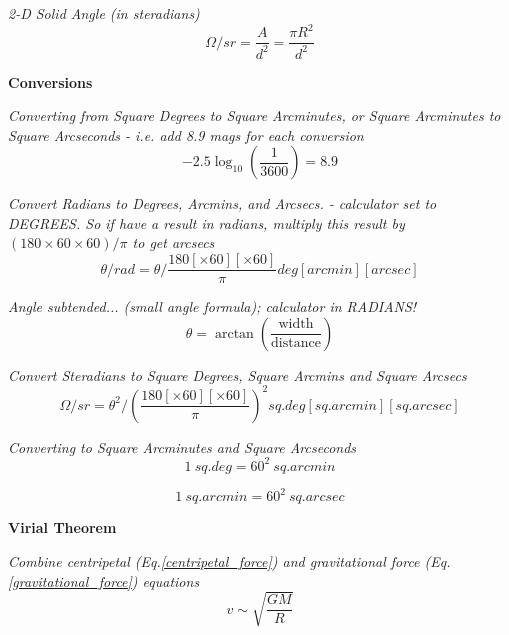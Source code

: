 \documentclass{spy}
\begin{document}
\textit {2-D Solid Angle (in steradians)}
\begin{equation}
\Omega/sr = \frac {A} {d^2} = \frac {\pi R^2} {d^2}
\end{equation}

\textbf {Conversions}

\textit {Converting from Square Degrees to Square Arcminutes, or Square Arcminutes to Square Arcseconds - i.e. add 8.9 mags for each conversion}
\begin{equation}
-2.5 \log _\mathrm{10} \left( \frac {1}{3600} \right) = 8.9
\end{equation}

\textit{Convert Radians to Degrees, Arcmins, and Arcsecs. - calculator set to DEGREES. So if have a result in radians, multiply this result by \((180 \times 60 \times 60) / \pi\) to get arcsecs}
\begin{equation}
\theta/rad = \theta / \frac{180 \left[\times 60\right] \left[\times 60\right]} {\pi} deg \left[arcmin\right] \left[arcsec\right]
\end{equation}

\textit {Angle subtended... (small angle formula); calculator in RADIANS!}
\begin{equation}
\theta = \arctan\left(\frac {\mathrm{width}}{\mathrm{distance}} \right)
\end{equation}


\textit {Convert Steradians to Square Degrees, Square Arcmins and Square Arcsecs}
\begin{equation}
\Omega/sr = \theta^2 / \left( \frac{180 \left[\times 60\right] \left[\times 60\right]}{\pi} \right)^2 sq.deg \left[sq.arcmin\right] \left[sq.arcsec\right]
\end{equation}

\textit {Converting to Square Arcminutes and Square Arcseconds}
\begin{equation}
1 \: sq.deg = 60^2 \: sq.arcmin
\end{equation}

\begin{equation}
1 \: sq.arcmin = 60^2 \: sq.arcsec
\end{equation}

\textbf {Virial Theorem}

\textit {Combine centripetal (Eq.\ref{centripetal_force}) and gravitational force (Eq.\ref{gravitational_force}) equations}
\begin{equation}
v \sim \sqrt {\frac{GM}{R}}
\end{equation}
\end{document}
